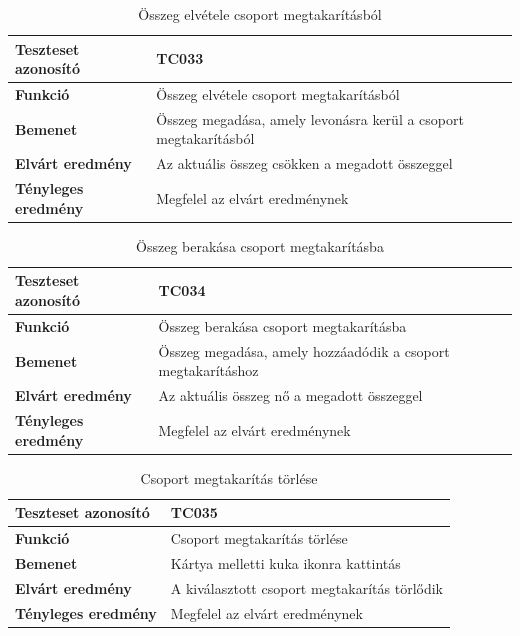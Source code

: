 \begin{table}[h!]
	\centering
	\begin{tabular}{|l|p{10cm}|}
		\hline
		\textbf{Teszteset azonosító} & TC033 \\ \hline
		\textbf{Funkció} & Összeg elvétele csoport megtakarításból \\ \hline
		\textbf{Bemenet} & Összeg megadása, amely levonásra kerül a csoport megtakarításból \\ \hline
		\textbf{Elvárt eredmény} & Az aktuális összeg csökken a megadott összeggel \\ \hline
		\textbf{Tényleges eredmény} & Megfelel az elvárt eredménynek \\ \hline
	\end{tabular}
	\caption{Összeg elvétele csoport megtakarításból}
	\label{tab:csoport_megtakaritas_elvetel}
\end{table}

\begin{table}[h!]
	\centering
	\begin{tabular}{|l|p{10cm}|}
		\hline
		\textbf{Teszteset azonosító} & TC034 \\ \hline
		\textbf{Funkció} & Összeg berakása csoport megtakarításba \\ \hline
		\textbf{Bemenet} & Összeg megadása, amely hozzáadódik a csoport megtakarításhoz \\ \hline
		\textbf{Elvárt eredmény} & Az aktuális összeg nő a megadott összeggel \\ \hline
		\textbf{Tényleges eredmény} & Megfelel az elvárt eredménynek \\ \hline
	\end{tabular}
	\caption{Összeg berakása csoport megtakarításba}
	\label{tab:csoport_megtakaritas_berakas}
\end{table}

\begin{table}[h!]
	\centering
	\begin{tabular}{|l|p{10cm}|}
		\hline
		\textbf{Teszteset azonosító} & TC035 \\ \hline
		\textbf{Funkció} & Csoport megtakarítás törlése \\ \hline
		\textbf{Bemenet} & Kártya melletti kuka ikonra kattintás \\ \hline
		\textbf{Elvárt eredmény} & A kiválasztott csoport megtakarítás törlődik \\ \hline
		\textbf{Tényleges eredmény} & Megfelel az elvárt eredménynek \\ \hline
	\end{tabular}
	\caption{Csoport megtakarítás törlése}
	\label{tab:csoport_megtakaritas_torles}
\end{table}

